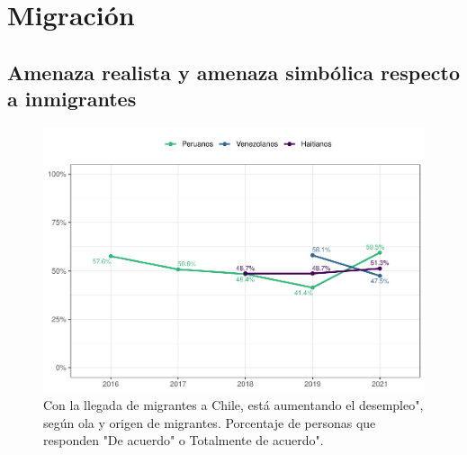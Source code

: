 \documentclass[
  12pt,
  openany]{book}
\begin{document}
\hypertarget{migraciuxf3n}{%
\chapter{Migración}\label{migraciuxf3n}}

\hypertarget{amenaza-realista-y-amenaza-simbuxf3lica-respecto-a-inmigrantes}{%
\section{Amenaza realista y amenaza simbólica respecto a inmigrantes}\label{amenaza-realista-y-amenaza-simbuxf3lica-respecto-a-inmigrantes}}

\begin{figure}

{\centering \includegraphics{reporte-elsoc_files/figure-latex/amen1-wave-1} 

}

\caption{Con la llegada de migrantes a Chile, está aumentando el desempleo", según ola y origen de migrantes. Porcentaje de personas que responden "De acuerdo" o Totalmente de acuerdo".}\label{fig:amen1-wave}
\end{figure}
\end{document}

